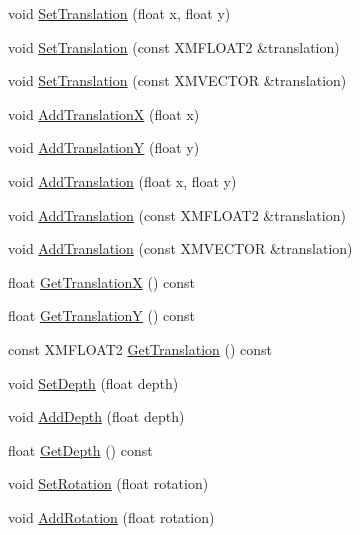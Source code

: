 \begin{DoxyCompactItemize}
\item 
void \hyperlink{structmage_1_1_sprite_transform_aa8e838691b090b12ed275aeb61413d80}{Set\+Translation} (float x, float y)
\item 
void \hyperlink{structmage_1_1_sprite_transform_a65a6ccde86d9697dd9568e49f709570a}{Set\+Translation} (const X\+M\+F\+L\+O\+A\+T2 \&translation)
\item 
void \hyperlink{structmage_1_1_sprite_transform_a21c306b8fa2dc250ca7d1a3339da33e3}{Set\+Translation} (const X\+M\+V\+E\+C\+T\+OR \&translation)
\item 
void \hyperlink{structmage_1_1_sprite_transform_a19726f8905e837126c0d566c7e68ea3c}{Add\+TranslationX} (float x)
\item 
void \hyperlink{structmage_1_1_sprite_transform_ad3d94aefc790ec25ba67563fbc8b8dab}{Add\+TranslationY} (float y)
\item 
void \hyperlink{structmage_1_1_sprite_transform_a093c1586c22ee8a12d91d897978bc03f}{Add\+Translation} (float x, float y)
\item 
void \hyperlink{structmage_1_1_sprite_transform_a19f756cd4e9d52621c420fe32be20bba}{Add\+Translation} (const X\+M\+F\+L\+O\+A\+T2 \&translation)
\item 
void \hyperlink{structmage_1_1_sprite_transform_a69209cdc9f7b678e66e76d4bc62071f6}{Add\+Translation} (const X\+M\+V\+E\+C\+T\+OR \&translation)
\item 
float \hyperlink{structmage_1_1_sprite_transform_ab33e1ff3c03940072538fe4a6b746f10}{Get\+TranslationX} () const
\item 
float \hyperlink{structmage_1_1_sprite_transform_a7cf25b0261f0fd65339a9c3e119e2573}{Get\+TranslationY} () const
\item 
const X\+M\+F\+L\+O\+A\+T2 \hyperlink{structmage_1_1_sprite_transform_acc7d00e636101c9c9b882f60ddcb93d5}{Get\+Translation} () const
\item 
void \hyperlink{structmage_1_1_sprite_transform_a25096a75c5b2fbb08b771b14567cc16e}{Set\+Depth} (float depth)
\item 
void \hyperlink{structmage_1_1_sprite_transform_a9865d77d9c2e02758b1466423c12bcc2}{Add\+Depth} (float depth)
\item 
float \hyperlink{structmage_1_1_sprite_transform_a9dfb5844abddaf3648f887f21db7077d}{Get\+Depth} () const
\item 
void \hyperlink{structmage_1_1_sprite_transform_a23921afd58b631f297328cf2b34d5c40}{Set\+Rotation} (float rotation)
\item 
void \hyperlink{structmage_1_1_sprite_transform_a0a24823966ff906791ae598ac4248d03}{Add\+Rotation} (float rotation)

\end{DoxyCompactItemize}
